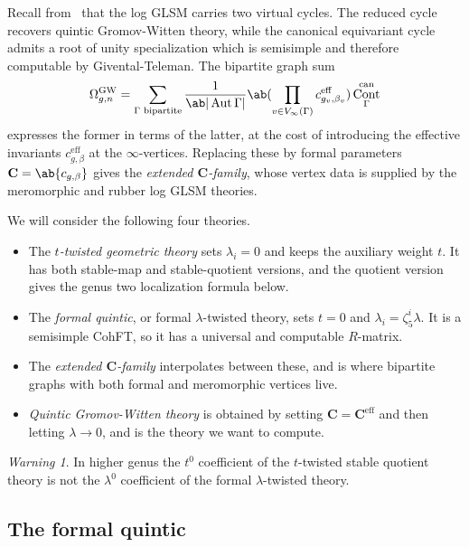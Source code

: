 \documentclass{amsart}
\theoremstyle{definition}
\theoremstyle{remark}
\newtheorem{warn}[thm]{Warning}
\theoremstyle{plain}
\theoremstyle{definition}
\theoremstyle{remark}
\newcommand{\mbf}[1]{\mathbf{#1}}
\newcommand{\mr}[1]{\mathrm{#1}}
\newcommand{\1}{\mathbf{1}}
\newcommand{\2}{\mathbf{2}}
\newcommand{\3}{\mathbf{3}}
\DeclareMathOperator{\Aut}{Aut}
\DeclareMathOperator{\Cont}{Cont}
\begin{document}
Recall from~ that the log GLSM carries two virtual cycles. The reduced cycle recovers quintic Gromov-Witten theory, while the canonical equivariant cycle admits a root of unity specialization which is semisimple and therefore computable by Givental-Teleman. The bipartite graph sum
\[ \Omega^{\mr{GW}}_{g,n} = \sum_{\Gamma \text{ bipartite}} \frac{1}{\ab|\Aut \Gamma|} \ab( \prod_{v \in V_{\infty}(\Gamma)} c^{\mr{eff}}_{g_v,\beta_v}) \Cont^{\mr{can}}_{\Gamma} \]
expresses the former in terms of the latter, at the cost of introducing the effective invariants \(c^{\mr{eff}}_{g,\beta}\) at the \(\infty\)-vertices. Replacing these by formal parameters \(\mbf{C} = \ab\{c_{g,\beta}\}\) gives the \textit{extended \(\mbf{C}\)-family}, whose vertex data is supplied by the meromorphic and rubber log GLSM theories.

We will consider the following four theories.
\begin{itemize}
    \item The \textit{\(t\)-twisted geometric theory} sets \(\lambda_i = 0\) and keeps the auxiliary weight \(t\). It has both stable-map and stable-quotient versions, and the quotient version gives the genus two localization formula below.
    \item The \textit{formal quintic}, or formal \(\lambda\)-twisted theory, sets \(t = 0\) and \(\lambda_i = \zeta_5^i \lambda\). It is a semisimple CohFT, so it has a universal and computable \(R\)-matrix.
    \item The \textit{extended \(\mbf{C}\)-family} interpolates between these, and is where bipartite graphs with both formal and meromorphic vertices live.
    \item \textit{Quintic Gromov-Witten theory} is obtained by setting \(\mbf{C} = \mbf{C}^{\mr{eff}}\) and then letting \(\lambda \to 0\), and is the theory we want to compute.
\end{itemize}

\begin{warn}
    In higher genus the \(t^0\) coefficient of the \(t\)-twisted stable quotient theory is not the \(\lambda^0\) coefficient of the formal \(\lambda\)-twisted theory.
\end{warn}

\subsection{The formal quintic}%
\label{sub:The formal quintic}
\end{document}

